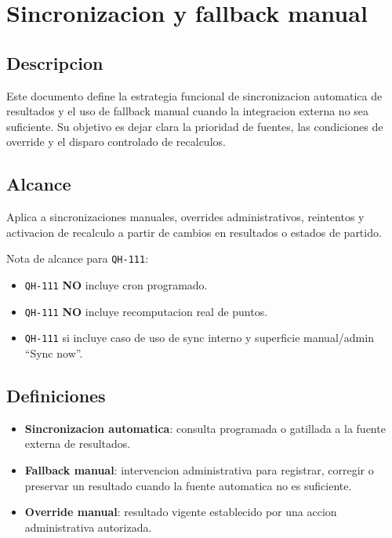 \section{Sincronizacion y fallback manual}

\subsection{Descripcion}

Este documento define la estrategia funcional de sincronizacion automatica de resultados y el uso de fallback manual cuando la integracion externa no sea suficiente. Su objetivo es dejar clara la prioridad de fuentes, las condiciones de override y el disparo controlado de recalculos.

\subsection{Alcance}

Aplica a sincronizaciones manuales, overrides administrativos, reintentos y activacion de recalculo a partir de cambios en resultados o estados de partido.

Nota de alcance para \texttt{QH-111}:
\begin{itemize}
  \item \texttt{QH-111} \textbf{NO} incluye cron programado.
  \item \texttt{QH-111} \textbf{NO} incluye recomputacion real de puntos.
  \item \texttt{QH-111} si incluye caso de uso de sync interno y superficie manual/admin ``Sync now''.
\end{itemize}

\subsection{Definiciones}

\begin{itemize}
  \item \textbf{Sincronizacion automatica}: consulta programada o gatillada a la fuente externa de resultados.
  \item \textbf{Fallback manual}: intervencion administrativa para registrar, corregir o preservar un resultado cuando la fuente automatica no es suficiente.
  \item \textbf{Override manual}: resultado vigente establecido por una accion administrativa autorizada.
\end{itemize}

